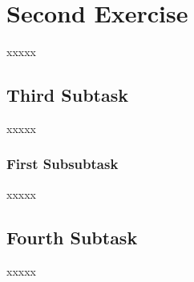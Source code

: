 \documentclass[a4paper, 11pt]{article} %
\begin{document}
\section{Second Exercise}
xxxxx

\subsection{Third Subtask}
xxxxx

\subsubsection{First Subsubtask}
xxxxx

\subsection{Fourth Subtask}
xxxxx

\bigskip



\end{document}
